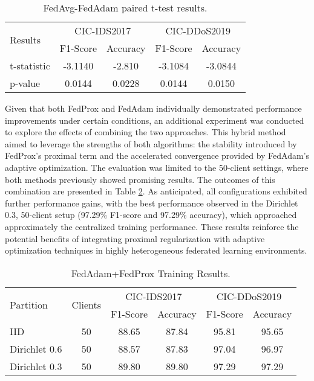 \begin{table}[h]
    \caption{FedAvg-FedAdam paired t-test results.}
    \centering
    \begin{tabular}{l|c|c|c|c}
        \multirow{2}{*}{Results} & \multicolumn{2}{|c|}{CIC-IDS2017} & \multicolumn{2}{|c}{CIC-DDoS2019} \\
        \cline{2-5} & F1-Score & Accuracy & F1-Score & Accuracy \\
        \hline\hline
        t-statistic & -3.1140 & -2.810 & -3.1084 & -3.0844 \\
        p-value & 0.0144 & 0.0228 & 0.0144 & 0.0150 \\
    \end{tabular}
    \label{tbl:fedavg_fedadam_compare}
\end{table}

Given that both FedProx and FedAdam individually demonstrated performance improvements under certain conditions, an additional experiment was conducted to explore the effects of combining the two approaches. This hybrid method aimed to leverage the strengths of both algorithms: the stability introduced by FedProx's proximal term and the accelerated convergence provided by FedAdam's adaptive optimization. The evaluation was limited to the 50-client settings, where both methods previously showed promising results. The outcomes of this combination are presented in Table \ref{tbl:fedadam_fedprox_results}. As anticipated, all configurations exhibited further performance gains, with the best performance observed in the Dirichlet 0.3, 50-client setup (97.29\% F1-score and 97.29\% accuracy), which approached approximately the centralized training performance. These results reinforce the potential benefits of integrating proximal regularization with adaptive optimization techniques in highly heterogeneous federated learning environments.

\begin{table}[h]
    \caption{FedAdam+FedProx Training Results.}
    \centering
    \begin{tabular}{l|c|c|c|c|c}
        \multirow{2}{*}{Partition} & \multirow{2}{*}{Clients} & \multicolumn{2}{|c|}{CIC-IDS2017} & \multicolumn{2}{|c}{CIC-DDoS2019} \\
        \cline{3-6} & & F1-Score & Accuracy & F1-Score & Accuracy \\
        \hline\hline
        IID & 50 & 88.65 & 87.84 & 95.81 & 95.65 \\
        Dirichlet 0.6 & 50 & 88.57 & 87.83 & 97.04 & 96.97 \\
        Dirichlet 0.3 & 50 & 89.80 & 89.80 & 97.29 & 97.29 \\
    \end{tabular}
    \label{tbl:fedadam_fedprox_results}
\end{table}
